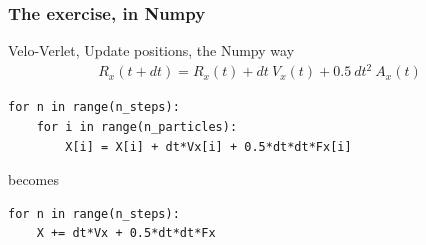 \begin{frame}[fragile]

    \frametitle{The exercise, in Numpy}

    Velo-Verlet, Update positions, the Numpy way
    \begin{align*}
        R_x(t + dt) = R_x(t) + dt\ V_x(t) + 0.5\ dt^2\ A_x(t) \label{eq:position_x}
    \end{align*}


    \bigskip

\begin{lstlisting}
for n in range(n_steps):
    for i in range(n_particles):
        X[i] = X[i] + dt*Vx[i] + 0.5*dt*dt*Fx[i]
\end{lstlisting}

becomes

\begin{lstlisting}
for n in range(n_steps):
    X += dt*Vx + 0.5*dt*dt*Fx
\end{lstlisting}

\end{frame}









